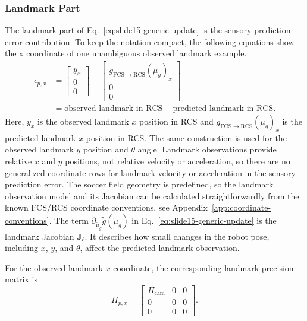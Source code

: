 \subsubsection{Landmark Part}
\label{subsec:gradient-landmarks}

The landmark part of Eq.~\ref{eq:slide15-generic-update} is the sensory prediction-error contribution.
To keep the notation compact, the following equations show the x coordinate of one unambiguous observed landmark example.
\begin{align}
    \tilde{\epsilon}_{p,x}
    &=
    \begin{bmatrix}
        y_x \\
        0 \\
        0
    \end{bmatrix}
    -
    \begin{bmatrix}
        g_{\mathrm{FCS}\rightarrow\mathrm{RCS}}(\mu_g)_x \\
        0 \\
        0
    \end{bmatrix}
    \nonumber \\
    &=
    \text{observed landmark in RCS}
    -
    \text{predicted landmark in RCS}.
    \label{eq:landmark-error-x}
\end{align}
Here, $y_x$ is the observed landmark $x$ position in RCS and $g_{\mathrm{FCS}\rightarrow\mathrm{RCS}}(\mu_g)_x$ is the predicted landmark $x$ position in RCS. The same construction is used for the observed landmark $y$ position and $\theta$ angle.
Landmark observations provide relative $x$ and $y$ positions, not relative velocity or acceleration, so there are no generalized-coordinate rows for landmark velocity or acceleration in the sensory prediction error.
The soccer field geometry is predefined, so the landmark observation model and its Jacobian can be calculated straightforwardly from the known FCS/RCS coordinate conventions, see Appendix~\ref{app:coordinate-conventions}.
The term $\partial_{\tilde\mu_g}\tilde{g}(\tilde{\mu}_g)$ in Eq.~\ref{eq:slide15-generic-update} is the landmark Jacobian $\boldsymbol{J}_{\ell}$. It describes how small changes in the robot pose, including $x$, $y$, and $\theta$, affect the predicted landmark observation.

For the observed landmark $x$ coordinate, the corresponding landmark precision matrix is
\begin{equation}
    \tilde{\Pi}_{p,x}
    =
    \begin{bmatrix}
        \Pi_{\mathrm{cam}} & 0 & 0 \\
        0 & 0 & 0 \\
        0 & 0 & 0
    \end{bmatrix}.
    \label{eq:landmark-precision-x}
\end{equation}

